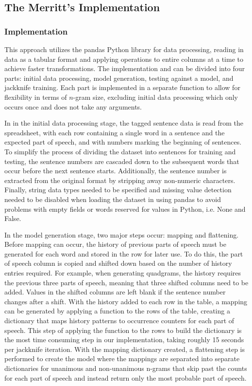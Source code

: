 \subsection{The Merritt's Implementation}

\subsubsection{Implementation}

This approach utilizes the pandas Python library for data processing, reading in data as a tabular format and applying operations to entire columns at a time to achieve faster transformations. The implementation and can be divided into four parts: initial data processing, model generation, testing against a model, and jackknife training. Each part is implemented in a separate function to allow for flexibility in terms of $n$-gram size, excluding initial data processing which only occurs once and does not take any arguments. 

In in the initial data processing stage, the tagged sentence data is read from the spreadsheet, with each row containing a single word in a sentence and the expected part of speech, and with numbers marking the beginning of sentences. To simplify the process of dividing the dataset into sentences for training and testing, the sentence numbers are cascaded down to the subsequent words that occur before the next sentence starts. Additionally, the sentence number is extracted from the original format by stripping away non-numeric characters. Finally, string data types needed to be specified and missing value detection needed to be disabled when loading the dataset in using pandas to avoid problems with empty fields or words reserved for values in Python, i.e. None and False.

In the model generation stage, two major steps occur: mapping and flattening. Before mapping can occur, the history of previous parts of speech must be generated for each word and stored in the row for later use. To do this, the part of speech column is copied and shifted down based on the number of history entries required. For example, when generating quadgrams, the history requires the previous three parts of speech, meaning that three shifted columns need to be added. Values in the shifted columns are left blank if the sentence number changes after a shift. With the history added to each row in the table, a mapping can be generated by applying a function to the rows of the table, creating a dictionary that maps history patterns to occurrence counters for each part of speech. This step of applying the function to the rows to build the dictionary is the most time consuming step in our implementation, taking roughly 15 seconds per jackknife iteration. With the mapping dictionary created, a flattening step is performed to create the model where the mappings are separated into separate dictionaries for unanimous and non-unanimous n-grams that skip past the counts for each part of speech and instead return only the most probable part of speech. 

